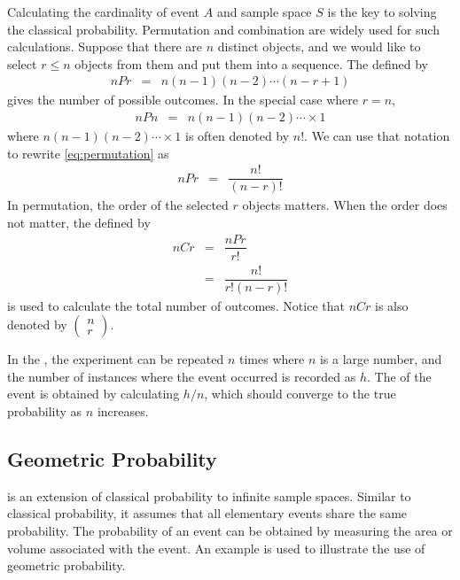 Calculating the cardinality of event $A$ and sample space $S$ is the key to solving the classical probability. Permutation and combination are widely used for such calculations. Suppose that there are $n$ distinct objects, and we would like to select $r\leq n$ objects from them and put them into a sequence. The  defined by
\begin{eqnarray}
  nPr &=& n(n-1)(n-2)\cdots (n-r+1) \label{eq:permutation}
\end{eqnarray}
gives the number of possible outcomes. In the special case where $r=n$,
\begin{eqnarray}
  nPn &=& n(n-1)(n-2)\cdots \times 1 \nonumber
\end{eqnarray}
where $n(n-1)(n-2)\cdots \times 1$ is often denoted by $n!$. We can use that notation to rewrite \eqref{eq:permutation} as
\begin{eqnarray}
  nPr &=& \dfrac{n!}{(n-r)!} \nonumber
\end{eqnarray}
In permutation, the order of the selected $r$ objects matters. When the order does not matter, the  defined by
\begin{eqnarray}
  nCr &=& \dfrac{nPr}{r!} \nonumber \\
  &=& \dfrac{n!}{r!(n-r)!} \nonumber
\end{eqnarray}
is used to calculate the total number of outcomes. Notice that $nCr$ is also denoted by $\left(\begin{array}{c}
                                                                                           n \\
                                                                                           r
                                                                                         \end{array}\right)$.

In the , the experiment can be repeated $n$ times where $n$ is a large number, and the number of instances where the event occurred is recorded as $h$. The  of the event is obtained by calculating $h/n$, which should converge to the true probability as $n$ increases.

\subsection{Geometric Probability}

 is an extension of classical probability to infinite sample spaces. Similar to classical probability, it assumes that all elementary events share the same probability. The probability of an event can be obtained by measuring the area or volume associated with the event. An example is used to illustrate the use of geometric probability.

